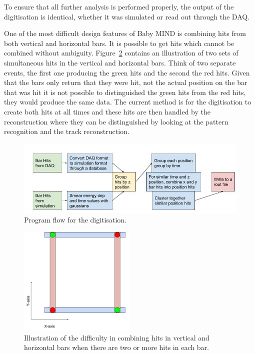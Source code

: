 To ensure that all further analysis is performed properly, the output of the digitisation is identical, whether it was simulated or read out through the DAQ.

One of the most difficult design features of Baby MIND is combining hits from both vertical and horizontal bars. It is possible to get hits which cannot be combined without ambiguity. Figure~\ref{fig:BarAmbi} contains an illustration of two sets of simultaneous hits in the vertical and horizontal bars. Think of two separate events, the first one producing the green hits and the second the red hits. Given that the bars only return that they were hit, not the actual position on the bar that was hit it is not possible to distinguished the green hits from the red hits, they would produce the same data. The current method is for the digitisation to create both hits at all times and these hits are then handled by the reconstruction where they can be distinguished by looking at the pattern recognition and the track reconstruction.

\begin{figure}[h!]
\centering
\includegraphics[width=\textwidth]{figures/Digitisation.jpg}
\caption{Program flow for the digitisation.}
\label{fig:digi}
\end{figure}

\begin{figure}[h!]
\centering
\includegraphics[width=0.5\textwidth]{figures/BarsAmbi.jpg}
\caption{Illustration of the difficulty in combining hits in vertical and horizontal bars when there are two or more hits in each bar.}
\label{fig:BarAmbi}
\end{figure}

